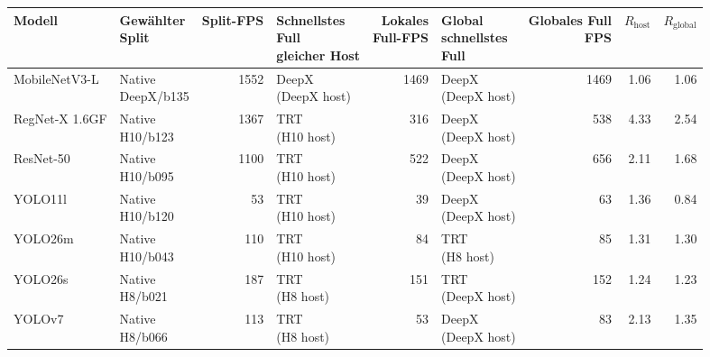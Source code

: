 \begin{tabular}{l l r l r l r r r}
\toprule
Modell & \shortstack{Gewählter\\Split} & Split-FPS & \shortstack{Schnellstes\\Full\\gleicher Host} & \shortstack{Lokales\\Full-FPS} & \shortstack{Global\\schnellstes\\Full} & \shortstack{Globales Full\\FPS} & $R_{\mathrm{host}}$ & $R_{\mathrm{global}}$ \\
\midrule
MobileNetV3-L & \shortstack[l]{Native\\DeepX/b135} & 1552 & \shortstack[l]{DeepX\\(DeepX host)} & 1469 & \shortstack[l]{DeepX\\(DeepX host)} & 1469 & 1.06 & 1.06 \\
RegNet-X 1.6GF & \shortstack[l]{Native\\H10/b123} & 1367 & \shortstack[l]{TRT\\(H10 host)} & 316 & \shortstack[l]{DeepX\\(DeepX host)} & 538 & 4.33 & 2.54 \\
ResNet-50 & \shortstack[l]{Native\\H10/b095} & 1100 & \shortstack[l]{TRT\\(H10 host)} & 522 & \shortstack[l]{DeepX\\(DeepX host)} & 656 & 2.11 & 1.68 \\
YOLO11l & \shortstack[l]{Native\\H10/b120} & 53 & \shortstack[l]{TRT\\(H10 host)} & 39 & \shortstack[l]{DeepX\\(DeepX host)} & 63 & 1.36 & 0.84 \\
YOLO26m & \shortstack[l]{Native\\H10/b043} & 110 & \shortstack[l]{TRT\\(H10 host)} & 84 & \shortstack[l]{TRT\\(H8 host)} & 85 & 1.31 & 1.30 \\
YOLO26s & \shortstack[l]{Native\\H8/b021} & 187 & \shortstack[l]{TRT\\(H8 host)} & 151 & \shortstack[l]{TRT\\(DeepX host)} & 152 & 1.24 & 1.23 \\
YOLOv7 & \shortstack[l]{Native\\H8/b066} & 113 & \shortstack[l]{TRT\\(H8 host)} & 53 & \shortstack[l]{DeepX\\(DeepX host)} & 83 & 2.13 & 1.35 \\
\bottomrule
\end{tabular}
\endgroup

